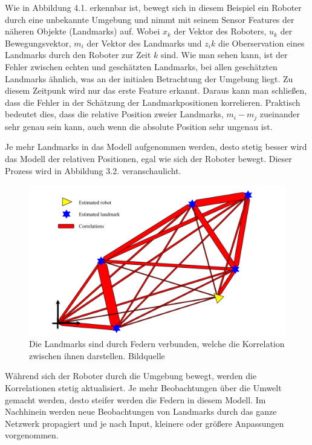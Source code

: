 Wie in Abbildung 4.1. erkennbar ist, bewegt sich in diesem Beispiel ein Roboter durch eine unbekannte Umgebung und nimmt mit seinem Sensor Features der näheren Objekte (Landmarks) auf. Wobei $x_k$ der Vektor des Roboters,  $u_k$ der Bewegungsvektor, $m_i$ der Vektor des Landmarks und $z_ik$ die Oberservation eines Landmarks durch den Roboter zur Zeit $k$ sind. Wie man sehen kann, ist der Fehler zwischen echten und geschätzten Landmarks, bei allen geschätzten Landmarks ähnlich, was an der initialen Betrachtung der Umgebung liegt. Zu diesem Zeitpunk wird nur das erste Feature erkannt. Daraus kann man schließen, dass die Fehler in der Schätzung der Landmarkpositionen korrelieren. Praktisch bedeutet dies, dass die relative Position zweier Landmarks, $m_i - m_j$ zueinander sehr genau sein kann, auch wenn die absolute Position sehr ungenau ist. 

Je mehr Landmarks in das Modell aufgenommen werden, desto stetig besser wird das Modell der relativen Positionen, egal wie sich der Roboter bewegt. Dieser Prozess wird in Abbildung 3.2. veranschaulicht.

\begin{figure}[H]
	\centering
	\includegraphics[scale=0.5]{slam_springs.png}
	\caption{Die Landmarks sind durch \glqq Federn\grqq{} verbunden, welche die Korrelation zwischen ihnen darstellen.  Bildquelle \cite{slam}}
\end{figure}  

Während sich der Roboter durch die Umgebung bewegt, werden die Korrelationen stetig aktualisiert. Je mehr Beobachtungen über die Umwelt gemacht werden, desto steifer werden die Federn in diesem Modell. Im Nachhinein werden neue Beobachtungen von Landmarks durch das ganze Netzwerk propagiert und je nach Input, kleinere oder größere Anpassungen vorgenommen.

